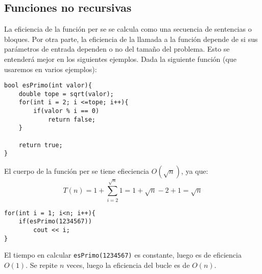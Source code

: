 \subsection{Funciones no recursivas}
La eficiencia de la función per se se calcula como una secuencia de sentencias o bloques. Por otra parte, la eficiencia de la llamada a la función depende de si sus parámetros de entrada dependen o no del tamaño del problema. Esto se entenderá mejor en los siguientes ejemplos. Dada la siguiente función (que usaremos en varios ejemplos):
\begin{listing}[H]
\begin{verbatim}
bool esPrimo(int valor){
    double tope = sqrt(valor);
    for(int i = 2; i <=tope; i++){
        if(valor % i == 0)
            return false;
    }
    
    return true;
}
\end{verbatim}
\end{listing}
El cuerpo de la función per se tiene efieciencia $O(\sqrt{n})$, ya que:
\begin{equation*}
    T(n) = 1 + \sum_{i=2}^{\sqrt{n}} 1 = 1 + \sqrt{n}-2+1 = \sqrt{n}
\end{equation*}

\begin{ejemplo}
\begin{listing}[H]
\begin{verbatim}
for(int i = 1; i<n; i++){
    if(esPrimo(1234567))
        cout << i;
}
\end{verbatim}
\end{listing}
El tiempo en calcular \verb|esPrimo(1234567)| es constante, luego es de eficiencia $O(1)$. Se repite $n$ veces, luego la eficiencia del bucle es de $O(n)$.
\end{ejemplo}

